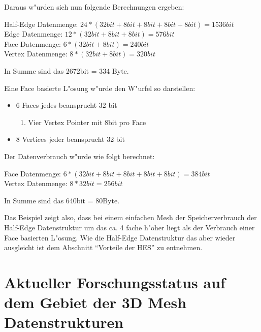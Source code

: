 \documentclass[pagesize, paper=a4, fontsize=12pt,titlepage=true, headings=small, headnosepline, abstractoff, liststotoc, nochapterprefix, plainheadsepline]{scrreprt}
\newcommand{\HES}{Half-Edge Datenstruktur }
\begin{document}
Daraus w"urden sich nun folgende Berechnungen ergeben:

	Half-Edge Datenmenge: \begin{math}24 * (32bit+ 8bit + 8bit + 8bit + 8bit) = 1536bit\end{math}
	\\
	Edge Datenmenge: \begin{math}12 * (32bit + 8bit + 8bit) = 576bit\end{math}
	\\
	Face Datenmenge: \begin{math}6 * (32bit + 8bit) = 240bit\end{math}
	\\
	Vertex Datenmenge: \begin{math}8 * (32bit + 8bit) = 320bit\end{math}

	In Summe sind das 2672bit = 334 Byte.
\newline

Eine Face basierte L"osung w"urde den W"urfel so darstellen:
\begin{itemize}
\item 6 Faces jedes beansprucht 32 bit
	\begin{enumerate}
    	\item Vier Vertex Pointer mit 8bit pro Face
	\end{enumerate}
\item 8 Vertices jeder beansprucht 32 bit
\end{itemize}

Der Datenverbrauch w"urde wie folgt berechnet:

	Face Datenmenge: \begin{math}6 * (32bit + 8bit + 8bit + 8bit + 8bit) = 384bit\end{math}
	\\
	Vertex Datenmenge: \begin{math}8 * 32bit = 256bit\end{math}

	In Summe sind das 640bit = 80Byte.
\newline

Das Beispiel zeigt also, dass bei einem einfachen Mesh der Speicherverbrauch der \HES um das ca. 4 fache h"oher liegt als der Verbrauch einer Face basierten L"osung. Wie die \HES das aber wieder ausgleicht ist dem Abschnitt "`Vorteile der HES"' zu entnehmen.
	\section {Aktueller Forschungsstatus auf dem Gebiet der 3D Mesh Datenstrukturen}
		
\end{document}
